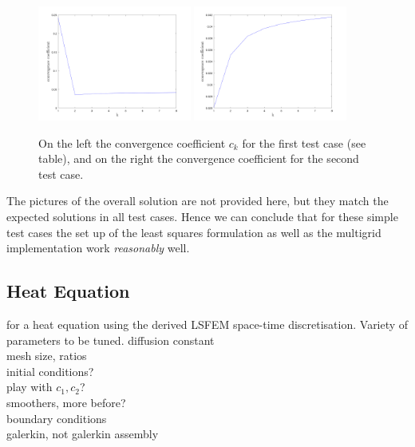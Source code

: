 \documentclass[../draft_1.tex]{subfiles}
\begin{document}
\begin{figure}[h!]
	\centering
	\includegraphics[width=0.45\textwidth]{images/implementation/poisson/test_case_1_conv_plot}
	\includegraphics[width=0.45\textwidth]{images/implementation/poisson/test_case_2_conv_plot}
	\caption{On the left the convergence coefficient $c_k$ for the first test case (see table), and on the right the convergence coefficient for the second test case.}
\end{figure}
The pictures of the overall solution are not provided here, but they match the expected solutions in all test cases. Hence we can conclude that for these simple test cases the set up of the least squares formulation as well as the multigrid implementation work \textit{reasonably} well.




\subsection{Heat Equation}

 for a heat equation using the derived LSFEM space-time discretisation.
 Variety of parameters to be tuned. 
 diffusion constant \\
 mesh size, ratios \\
  initial conditions? \\
  play with $c_1, c_2$? \\
  smoothers, more before? \\
  boundary conditions \\
  galerkin, not galerkin assembly \\
  
\end{document}
